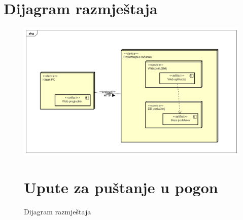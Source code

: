 			\eject 
		
		
		\section{Dijagram razmještaja}
			
			
			
			\begin{figure} [H]
			    \centering
			    \includegraphics[width=1.0\linewidth]{slike/Deployment_Diagram.png}
	            \caption{Dijagram razmještaja}
				\label{fig:Dijagram razmještaja}
		
			\eject 
		
		\section{Upute za puštanje u pogon}
		
		
			

\end{figure}
